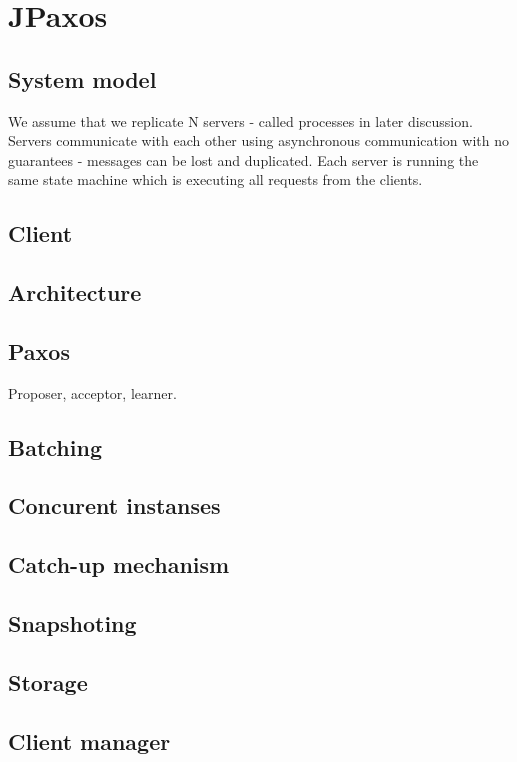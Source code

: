 
\chapter{JPaxos}

\section{System model}

We assume that we replicate N servers - called processes in later discussion.
Servers communicate with each other using asynchronous communication with no
guarantees - messages can be lost and duplicated. Each server is running the
same state machine which is executing all requests from the clients.

\section{Client}

\section{Architecture}

\section{Paxos}
Proposer, acceptor, learner.

\section{Batching}

\section{Concurent instanses}

\section{Catch-up mechanism}

\section{Snapshoting}

\section{Storage}

\section{Client manager}

